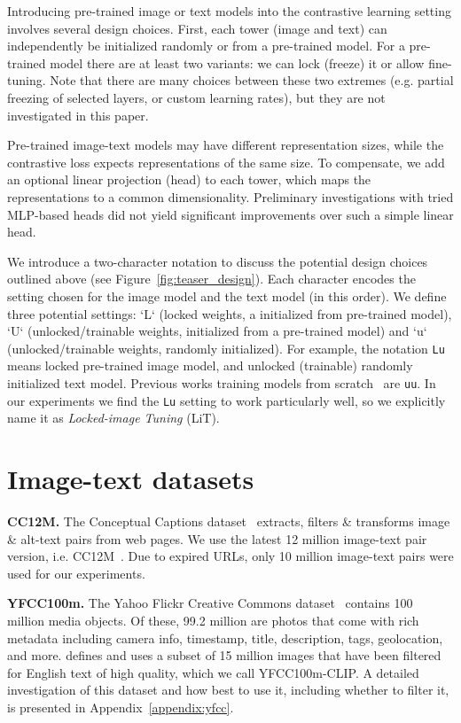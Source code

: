 \documentclass[10pt,twocolumn,letterpaper]{article}
\makeatletter
\def \flame {\raisebox{-.1\height}{\texttt{[image: images/Noto\_Emoji\_Pie\_1f525.pdf]}}\xspace}
\def \litf {LiT\flame{}\xspace}
\def \Lu {{\tt Lu}\xspace}
\def \uu {{\tt uu}\xspace}
\renewcommand*{\eg}{e.g.\@\xspace}
\renewcommand*{\ie}{i.e.\@\xspace}
\makeatother
\begin{document}
Introducing pre-trained image or text models into the contrastive learning setting involves several design choices. First, each tower (image and text) can independently be initialized randomly or from a pre-trained model. For a pre-trained model there are at least two variants: we can lock (freeze) it or allow fine-tuning. Note that there are many choices between these two extremes (\eg partial freezing of selected layers, or custom learning rates), but
they are not investigated in this paper.  

Pre-trained image-text models may have different representation sizes, while the contrastive loss expects representations of the same size. 
To compensate, we add an optional linear projection (head) to each tower, which maps the representations to a common dimensionality. 
Preliminary investigations with tried MLP-based heads did not yield significant improvements over such a simple linear head.

We introduce a two-character notation to discuss the potential design choices outlined above (see Figure~\ref{fig:teaser_design}).
Each character encodes the setting chosen for the image model and the text model (in this order).
We define three potential settings: `L` (locked weights, a initialized from pre-trained model), `U` (unlocked/trainable weights, initialized from a pre-trained model) and `u` (unlocked/trainable weights, randomly initialized).
For example, the notation \Lu means locked pre-trained image model, and unlocked (trainable) randomly initialized text model. Previous works training models from scratch~\cite{clip,align} are \uu. In our experiments we find the \Lu setting to work particularly well, so we explicitly name it as \textit{Locked-image Tuning} (\litf{}).




\section{Image-text datasets}\label{sec:data}

\textbf{CC12M.} The Conceptual Captions dataset~\cite{cc3m} extracts, filters 
\& transforms image \& alt-text pairs from web pages.
We use the latest 12 million image-text pair version, \ie CC12M~\cite{cc12m}.
Due to expired URLs, only 10 million image-text pairs were used for our experiments.

\textbf{YFCC100m.} The Yahoo Flickr Creative Commons dataset~\cite{yfcc100m} contains 100 million media objects. 
Of these, 99.2 million are photos that come with rich metadata including camera info, timestamp, title, description, tags, geolocation, and more. \cite{clip} defines and uses a subset of 15 million images that have been filtered for English text of high quality, which we call YFCC100m-CLIP. A detailed investigation of this dataset and how best to use it, including whether to filter it, is presented in Appendix~\ref{appendix:yfcc}.
\end{document}
